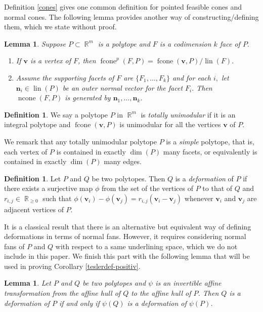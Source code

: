 \documentclass[12pt]{amsart}
\numberwithin{equation}{section}
\newtheorem{lem}[thm]{Lemma}
\theoremstyle{definition}
\newtheorem{defn}[thm]{Definition}
\def\fcone{\operatorname{fcone}}
\def\ncone{\operatorname{ncone}}
\def\lin{\operatorname{lin}}
\def\bv{{\boldsymbol{v}}}
\def\bn{\boldsymbol{n}}
\def\R{\operatorname{\mathbb{R}}}
\begin{document}
Definition \ref{cones} gives one common definition for pointed feasible cones and normal cones. The following lemma provides another way of constructing/defining them, which we state without proof. 

\begin{lem}\label{lem:construct-cones}
  Suppose $P \subset \R^m$ is a polytope and $F$ is a codimension $k$ face of $P.$ 
  \begin{enumerate}
    \item \label{itm:construct-fcone} If $\bv$ is a vertex of $F$, then $\fcone^p(F,P) = \fcone(\bv,P)/\lin(F).$ 

    \item \label{itm:construct-ncone} Assume the supporting facets of $F$ are $\{F_1, \dots, F_k\}$ and for each $i,$ let $\bn_i \in \lin(P)$ be an outer normal vector for the facet $F_i.$ Then $\ncone(F,P)$ is generated by $\bn_1, \dots, \bn_k$.
  \end{enumerate}
\end{lem}



\begin{defn} \label{defn:unimodular}
  We say a polytope $P$ in $\R^{m}$ is \emph{totally unimodular} if it is an integral polytope and $\fcone(\bv,P)$ is unimodular for all the vertices $\bv$ of $P$.
\end{defn}
We remark that any totally unimodular polytope $P$ is a \emph{simple} polytope, that is, each vertex of $P$ is contained in exactly $\dim(P)$ many facets, or equivalently is contained in exactly $\dim(P)$ many edges.

\begin{defn} \label{combisoeq}
  Let $P$ and $Q$ be two polytopes. Then $Q$ is a \emph{deformation} of $P$ if there exists a surjective map $\phi$ from the set of the vertices of $P$ to that of $Q$ and $r_{i,j} \in \R_{\geq0}$ such that $\phi(\bv_{i})-\phi(\bv_{j})=r_{i,j}(\bv_{i}-\bv_{j})$ whenever $\bv_{i}$ and $\bv_{j}$ are adjacent vertices of $P$.
\end{defn}
It is a classical result \cite{postnikov2008faces} that there is an alternative but equivalent way of defining deformations in terms of normal fans. However, it requires considering normal fans of $P$ and $Q$ with respect to a same underlining space, which we do not include in this paper.
We finish this part with the following lemma that will be used in proving Corollary \ref{teslerdef-positiv}.
\begin{lem} \label{unimodulardef}
Let $P$ and $Q$ be two polytopes and $\psi$ is an invertible affine transformation from the affine hull of $Q$ to the affine hull of $P$. Then $Q$ is a deformation of $P$ if and only if $\psi(Q)$ is a deformation of $\psi(P)$.
\end{lem}
\end{document}
